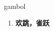 
\begin{frame}
{\huge gambol}
\begin{center}
\begin{enumerate}\Large
  \item \textbf{欢跳，雀跃}
\end{enumerate}
\end{center}
\end{frame}
